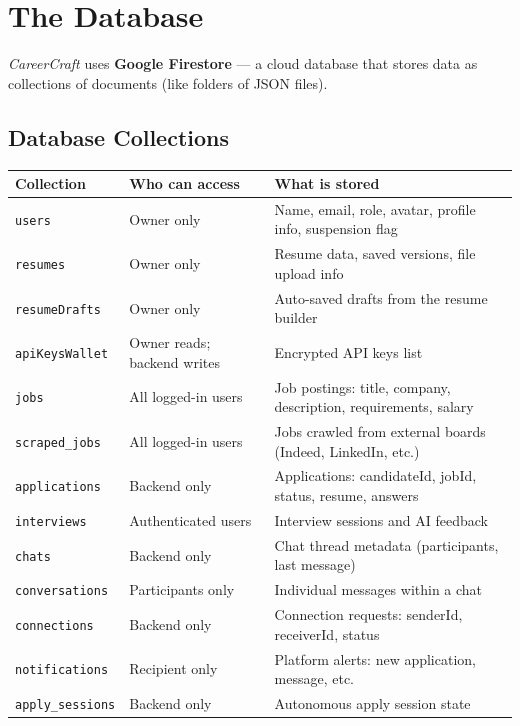 \documentclass[12pt, a4paper]{report}
\newcommand{\cc}{\textit{CareerCraft}}
\newcommand{\code}[1]{\texttt{\small #1}}
\begin{document}
\chapter{The Database}

\cc{} uses \textbf{Google Firestore} --- a cloud database that stores data as
collections of documents (like folders of JSON files).

\section{Database Collections}

\begin{center}
{\small
\begin{tabularx}{\textwidth}{llX}
\toprule
\textbf{Collection} & \textbf{Who can access} & \textbf{What is stored} \\
\midrule
\code{users}            & Owner only           & Name, email, role, avatar, profile info, suspension flag \\
\code{resumes}          & Owner only           & Resume data, saved versions, file upload info \\
\code{resumeDrafts}     & Owner only           & Auto-saved drafts from the resume builder \\
\code{apiKeysWallet}    & Owner reads; backend writes & Encrypted API keys list \\
\code{jobs}             & All logged-in users  & Job postings: title, company, description, requirements, salary \\
\code{scraped\_jobs}    & All logged-in users  & Jobs crawled from external boards (Indeed, LinkedIn, etc.) \\
\code{applications}     & Backend only         & Applications: candidateId, jobId, status, resume, answers \\
\code{interviews}       & Authenticated users  & Interview sessions and AI feedback \\
\code{chats}            & Backend only         & Chat thread metadata (participants, last message) \\
\code{conversations}    & Participants only    & Individual messages within a chat \\
\code{connections}      & Backend only         & Connection requests: senderId, receiverId, status \\
\code{notifications}    & Recipient only       & Platform alerts: new application, message, etc. \\
\code{apply\_sessions}  & Backend only         & Autonomous apply session state \\
\bottomrule
\end{tabularx}
}
\end{center}
\end{document}
